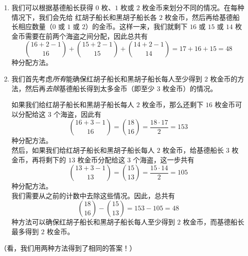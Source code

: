 \begin{example}
\begin{enumerate}[label=(\arabic*)]
                  \begin{enumerate}[label=(\roman*)]
                        \item 我们可以根据基德船长获得 $0$ 枚、$1$ 枚或 $2$ 枚金币来划分不同的情况。在每种情况下，我们会先给 红胡子船长和黑胡子船长各 $2$ 枚金币，然后再给基德船长相应数量（$0$ 或 $1$ 或 $2$）的金币。这样一来，我们就剩下 $16$ 或 $15$ 或 $14$ 枚金币需要在前两个海盗之间分配，因此总共有
                              \[{16+2-1 \choose 16}+{15+2-1 \choose 15}+{14+2-1 \choose 14}=17+16+15=48\]
                              种分配方法。
                        \item 我们首先考虑\emph{所有}能确保红胡子船长和黑胡子船长每人至少得到 $2$ 枚金币的方法，然后再\emph{去除}基德船长得到太多金币（即至少 $3$ 枚金币）的情况。

                              如果我们给红胡子船长和黑胡子船长每人 $2$ 枚金币，那么还剩下 $16$ 枚金币可以分配给这 $3$ 个海盗，因此有
                              \[{16+3-1 \choose 16}={18 \choose 16}=\frac{18 \cdot 17}{2}=153\]
                              种分配方法。\\

                              然后，如果我们给红胡子船长和黑胡子船长每人 $2$ 枚金币，给基德船长 $3$ 枚金币，再将剩下的 $13$ 枚金币分配给这 $3$ 个海盗，这一步共有
                              \[{13+3-1 \choose 13}={15 \choose 13}=\frac{15 \cdot 14}{2}=105\]
                              种分配方法。\\

                              我们需要从之前的计数中去除这些情况。因此，总共有
                              \[{18 \choose 16}-{15 \choose 13}=153 - 105 = 48\]
                              种方法可以确保红胡子船长和黑胡子船长每人至少得到 $2$ 枚金币，而基德船长最多得到 $2$ 枚金币。
                  \end{enumerate}
                  （看，我们用两种方法得到了相同的答案！）
      \end{enumerate}
\end{example}

